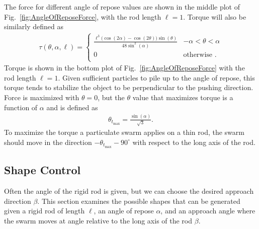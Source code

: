 The force for different angle of repose values are shown in the middle plot of Fig.~\ref{fig:AngleOfReposeForce}, with the rod length $\ell=1$. 
Torque will also be similarly defined as
\begin{align}
\tau(\theta, \alpha, \ell) =\left\{
\begin{array}{ll}
\frac{\ell^3\Big(\cos(2\alpha)-\cos(2\theta)\Big)\sin(\theta) }{48\sin^2(\alpha)}&   -\alpha<\theta<\alpha\\
0 &    \textrm{otherwise .}\\
\end{array} 
\right.
\end{align}
Torque is shown in the bottom plot of Fig.~\ref{fig:AngleOfReposeForce} with the rod length $\ell=1$. 
 Given sufficient particles to pile up to the angle of repose, this torque tends to stabilize the object to be perpendicular to the pushing direction.
Force is maximized with $\theta=0$, but the $\theta$ value that maximizes torque is a function of $\alpha$ and is defined as
\begin{align}\label{eq:maxTorqueAngleGivenAOR}
\theta_{t_{\max}} = \frac{\sin(\alpha)}{\sqrt{3}}.
\end{align}
To maximize the torque a particulate swarm applies on a thin rod, the swarm should move in the direction $-\theta_{t_{\max}} - 90^\circ$ with respect to the long axis of the rod.

\subsection{Shape Control}

Often the angle of the rigid rod is given, but we can choose the desired approach direction $\beta$. 
 This section examines the possible shapes that can be generated given a rigid rod of length $\ell$, an angle of repose $\alpha$, and an approach angle where the swarm moves at angle relative to the long axis of the rod $\beta$.

